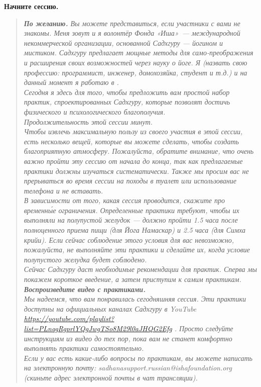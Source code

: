 \textbf{Начните сессию.}
\begin{quote}\emph{%
\noindent%
\textbf{По желанию.} {\color{CadetBlue}Вы можете представиться, если участники с вами не знакомы.} Меня зовут \underline{\qquad} и я волонтёр Фонда «Иша»~— международной некоммерческой организации, основанной Садхгуру — йогином и мистиком. Садхгуру предлагает мощные методы для само-преображения и расширения своих возможностей через науку о йоге.
        Я {\color{CadetBlue}(назвать свою профессию: программист, инженер, домохозяйка, студент и т.д.)} и на данный момент я работаю в \underline{\qquad}.
\\[10pt]
Сегодня я здесь для того, чтобы предложить вам простой набор практик,
спроектированных Садхгуру, которые позволят достичь физического и
психологического благополучия.
\\[3pt]
Продолжительность этой сессии \underline{\qquad} минут.
\\[3pt]
Чтобы извлечь максимальную пользу из своего участия в этой сессии, есть несколько вещей, которые вы можете сделать, чтобы создать благоприятную атмосферу. Пожалуйста, обратите внимание, что очень важно пройти эту сессию от начала до конца, так как предлагаемые практики должны изучаться систематически. Также мы просим вас не прерываться во время сессии на походы в туалет или использование телефона и не вставать.
\\[3pt]
{\color{CadetBlue}В зависимости от того, какая сессия проводится, скажите про временн\'{ы}е ограничения.} Определенные практики требуют, чтобы их выполняли на полупустой желудок — {\color{CadetBlue}должно пройти 1.5 часа после полноценного приема пищи (для Йога Намаскар) и 2.5 часа (для Симха крийи)}. Если сейчас соблюдение этого условия для вас невозможно, пожалуйста, не выполняйте эти практики и сделайте их, когда условие полупустого желудка будет соблюдено.
\\[3pt]
Сейчас Садхгуру даст необходимые рекомендации для практик. Сперва мы покажем короткое введение, а затем приступим к самим практикам. 
\\[15pt]
\textbf{\color{CadetBlue}Воспроизведите видео с практиками.
}
\\[15pt]
Мы надеемся, что вам понравилась сегодняшняя сессия. Эти практики
доступны на официальных каналах Садхгуру в YouTube \\ 
\href{https://youtube.com/playlist?list=PLnqgRgprlYQgJwgTSo8M29l0aJHQG2Efg}{\tiny https://youtube.com/playlist?list=PLnqgRgprlYQgJwgTSo8M29l0aJHQG2Efg} . Просто следуйте
инструкциям из видео до тех пор, пока вам не станет комфортно выполнять
практики самостоятельно.
\\[3pt]
Если у вас есть какие-либо вопросы по практикам, вы можете написать на
электронную почту: sadhanasupport.russian@ishafoundation.org {\color{CadetBlue}(скиньте адрес электронной почты в чат трансляции).}
}\end{quote}

